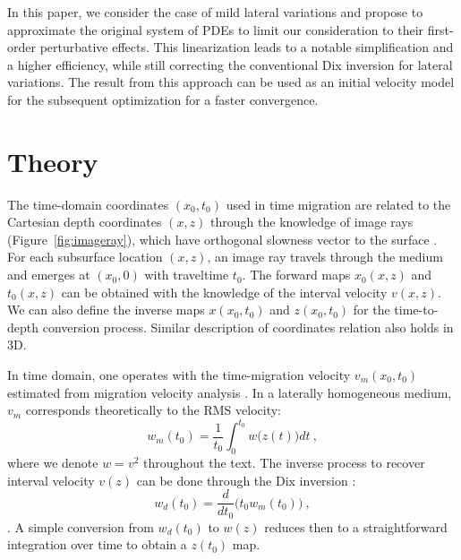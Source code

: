 
In this paper, we consider the case of mild lateral variations and propose to approximate the original system of PDEs to limit our consideration to their first-order perturbative effects. This linearization leads to a notable simplification and a higher efficiency, while still correcting the conventional Dix inversion for lateral variations. The result from this approach can be used as an initial velocity model for the subsequent optimization for a faster convergence.

\section{Theory}
The time-domain coordinates  $(x_0,t_0)$ used in time migration are related to the Cartesian depth coordinates $(x,z)$ through the knowledge of image rays (Figure~\ref{fig:imageray}), which have orthogonal slowness vector to the surface \cite[]{hubralimageray}. For each subsurface location $(x,z)$, an image ray travels through the medium and emerges at  $(x_0, 0)$ with traveltime $t_0$. The forward maps $x_0(x,z)$ and $t_0(x,z)$ can be obtained with the knowledge of the interval velocity $v(x,z)$. We can also define the inverse maps $x(x_0,t_0)$ and $z(x_0,t_0)$ for the time-to-depth conversion process. Similar description of coordinates relation also holds in 3D.


In time domain, one operates with the time-migration velocity $v_m(x_0,t_0)$ estimated from migration velocity analysis \cite[]{yilmaz,fomelvelcon2,fomelvelcon1}. In a laterally homogeneous medium, $v_m$ corresponds theoretically to the RMS velocity:
\begin{equation}
w_m(t_0) = \frac{1}{t_0}\int_0^{t_0} w\big(z(t)\big) dt~,
\end{equation}
where we denote $w=v^2$ throughout the text. The inverse process to recover interval velocity $v(z)$ can be done through the Dix inversion \cite[]{dix}:
\begin{equation}
\label{eq:dix}
w_d(t_0) = \frac{d}{dt_0} \big(t_0 w_m(t_0)\big)~,
\end{equation}
. A simple conversion from $w_d(t_0)$ to $w(z)$ reduces then to a straightforward integration over time to obtain a $z(t_0)$ map.


